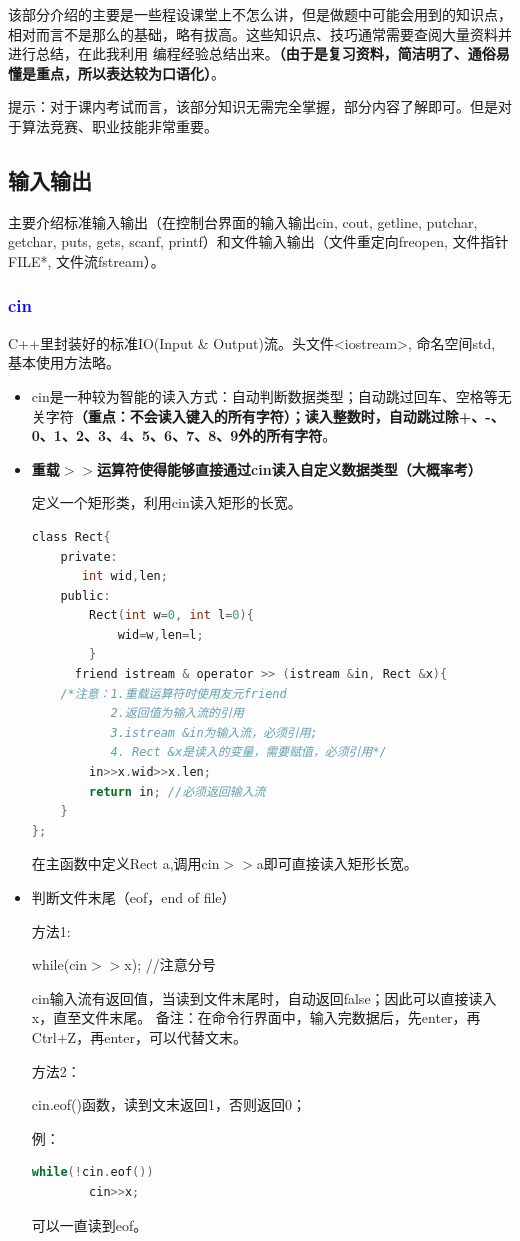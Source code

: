 \documentclass[UTF8]{ctexart}
\begin{document}
该部分介绍的主要是一些程设课堂上不怎么讲，但是做题中可能会用到的知识点，相对而言不是那么的基础，略有拔高。这些知识点、技巧通常需要查阅大量资料并进行总结，在此我利用
编程经验总结出来。\textbf{（由于是复习资料，简洁明了、通俗易懂是重点，所以表达较为口语化）}。

提示：对于课内考试而言，该部分知识无需完全掌握，部分内容了解即可。但是对于算法竞赛、职业技能非常重要。
\subsection{输入输出}
主要介绍标准输入输出（在控制台界面的输入输出cin, cout, getline, putchar, getchar, puts, gets, scanf, printf）和文件输入输出（文件重定向freopen, 文件指针 FILE*, 文件流fstream）。
\subsubsection{\textcolor{blue}{cin}}
C++里封装好的标准IO(Input \& Output)流。头文件<iostream>, 命名空间std, 基本使用方法略。
\begin{itemize}
  \item cin是一种较为智能的读入方式：自动判断数据类型；自动跳过回车、空格等无关字符\textbf{（重点：不会读入键入的所有字符）；读入整数时，自动跳过除+、-、0、1、2、3、4、5、6、7、8、9外的所有字符}。
  \item \textbf{重载$>>$运算符使得能够直接通过cin读入自定义数据类型（大概率考）}

  定义一个矩形类，利用cin读入矩形的长宽。
    \begin{lstlisting}[language = C,basicstyle=\small\ttfamily]
class Rect{
    private:
	   int wid,len;
	public:
		Rect(int w=0, int l=0){
			wid=w,len=l;
		}	
	  friend istream & operator >> (istream &in, Rect &x){
	/*注意：1.重载运算符时使用友元friend 
           2.返回值为输入流的引用
           3.istream &in为输入流，必须引用; 
           4. Rect &x是读入的变量，需要赋值，必须引用*/
		in>>x.wid>>x.len;
		return in; //必须返回输入流
	}
};
    \end{lstlisting}
    在主函数中定义Rect a,调用cin$>>$a即可直接读入矩形长宽。
  \item 判断文件末尾（eof，end of file）
  
方法1:
	
    while(cin$>>$x); //注意分号
    
	cin输入流有返回值，当读到文件末尾时，自动返回false；因此可以直接读入x，直至文件末尾。
	备注：在命令行界面中，输入完数据后，先enter，再Ctrl+Z，再enter，可以代替文末。

方法2：
	
    cin.eof()函数，读到文末返回1，否则返回0；
    
	例：
    \begin{lstlisting}[language = C,basicstyle=\small\ttfamily]
	while(!cin.eof())
		cin>>x;
    \end{lstlisting}
    可以一直读到eof。
\end{itemize}
\end{document}
